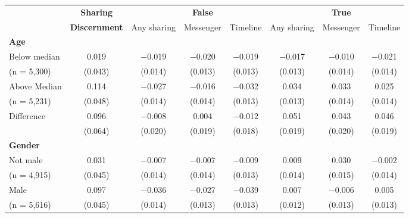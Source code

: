 
\begin{tabular}[t]{lccccccc}
 & \textbf{Sharing} &  & \textbf{False} &  &  & \textbf{True} & \\
 & \textbf{Discernment} & Any sharing & Messenger & Timeline & Any sharing & Messenger & Timeline\\\cmidrule(lr){2-2} \cmidrule(lr){3-5} \cmidrule(lr){6-8} \multicolumn{4}{l}{\textbf{Age}} \rule{0pt}{1.2\normalbaselineskip}\\
\hspace{1em} Below median & \num{0.019} & \num{-0.019} & \num{-0.020} & \num{-0.019} & \num{-0.017} & \num{-0.010} & \num{-0.021}\\
\hspace{2em}(n = 5,300) & (\num{0.043}) & (\num{0.014}) & (\num{0.013}) & (\num{0.013}) & (\num{0.013}) & (\num{0.014}) & (\num{0.014})\\
\hspace{1em} Above Median & \num{0.114} & \num{-0.027} & \num{-0.016} & \num{-0.032} & \num{0.034} & \num{0.033} & \num{0.025}\\
\hspace{2em}(n = 5,231) & (\num{0.048}) & (\num{0.014}) & (\num{0.014}) & (\num{0.013}) & (\num{0.013}) & (\num{0.014}) & (\num{0.014})\\\cmidrule(lr){2-8}
\hspace{1em} Difference & \num{0.096} & \num{-0.008} & \num{0.004} & \num{-0.012} & \num{0.051} & \num{0.043} & \num{0.046}\\
\hspace{2em} & (\num{0.064}) & (\num{0.020}) & (\num{0.019}) & (\num{0.018}) & (\num{0.019}) & (\num{0.020}) & (\num{0.019})\\\multicolumn{4}{l}{\textbf{Gender}} \rule{0pt}{1.2\normalbaselineskip}\\
\hspace{1em} Not male & \num{0.031} & \num{-0.007} & \num{-0.007} & \num{-0.009} & \num{0.009} & \num{0.030} & \num{-0.002}\\
\hspace{2em}(n = 4,915) & (\num{0.045}) & (\num{0.014}) & (\num{0.014}) & (\num{0.013}) & (\num{0.014}) & (\num{0.015}) & (\num{0.014})\\
\hspace{1em} Male & \num{0.097} & \num{-0.036} & \num{-0.027} & \num{-0.039} & \num{0.007} & \num{-0.006} & \num{0.005}\\
\hspace{2em}(n = 5,616) & (\num{0.045}) & (\num{0.014}) & (\num{0.013}) & (\num{0.013}) & (\num{0.012}) & (\num{0.013}) & (\num{0.013})\\\cmidrule(lr){2-8}

\end{tabular}
